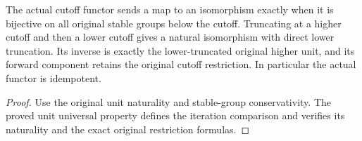 \begin{proposition}
  \label{prop:actual-postnikov-idempotence}
  \leanok
  The actual cutoff functor sends a map to an isomorphism exactly when it is bijective on all original stable groups below the cutoff. Truncating at a higher cutoff and then a lower cutoff gives a natural isomorphism with direct lower truncation. Its inverse is exactly the lower-truncated original higher unit, and its forward component retains the original cutoff restriction. In particular the actual functor is idempotent.
\end{proposition}
\begin{proof}
  Use the original unit naturality and stable-group conservativity. The proved unit universal property defines the iteration comparison and verifies its naturality and the exact original restriction formulas.
  \leanok
\end{proof}

